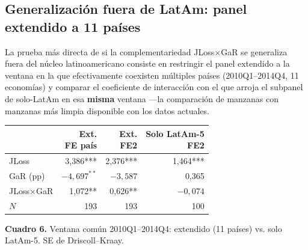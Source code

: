 \documentclass[5p,times,twocolumn,authoryear]{elsarticle}
\begin{document}
\subsection{Generalización fuera de LatAm: panel extendido a 11 países}

La prueba más directa de si la complementariedad JLoss$\times$GaR se generaliza fuera del núcleo latinoamericano consiste en restringir el panel extendido a la ventana en la que efectivamente coexisten múltiples países (2010Q1–2014Q4, 11 economías) y comparar el coeficiente de interacción con el que arroja el subpanel de solo-LatAm en esa \textbf{misma} ventana —la comparación de manzanas con manzanas más limpia disponible con los datos actuales.

\begin{center}
\footnotesize
\begin{tabular}{lrrr}
\toprule
 & \shortstack{Ext.\\FE país} & \shortstack{Ext.\\FE2} & \shortstack{Solo LatAm-5\\FE2} \\
\midrule
JLoss & 3,386*** & 2,376*** & 1,464*** \\
GaR (pp) & $-4,697^{**}$ & $-3,587$ & 0,365 \\
JLoss$\times$GaR & 1,072** & 0,626** & $-0,074$ \\
$N$ & 193 & 193 & 100 \\
\bottomrule
\end{tabular}

\medskip
\textbf{Cuadro 6.} Ventana común 2010Q1–2014Q4: extendido (11 países) vs. solo LatAm-5. SE de Driscoll–Kraay.
\end{center}
\end{document}
